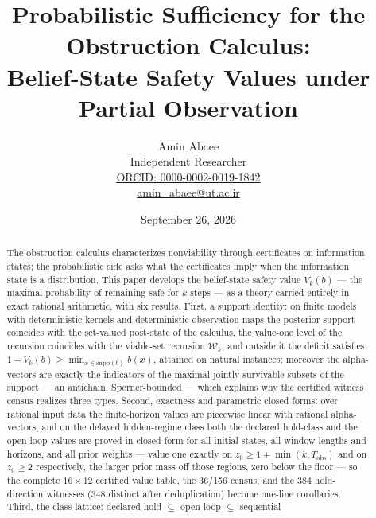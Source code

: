 \documentclass[10pt,twocolumn]{article}
\theoremstyle{plain}
\theoremstyle{definition}
\theoremstyle{remark}
\begin{document}
\title{Probabilistic Sufficiency for the Obstruction Calculus:\\
Belief-State Safety Values under Partial Observation}
\author{Amin Abaee\\[0.35em]
{\small Independent Researcher}\\[0.55em]
{\small\href{https://orcid.org/0000-0002-0019-1842}{ORCID: 0000-0002-0019-1842}}\\[0.3em]
{\small\href{mailto:amin\_abaee@ut.ac.ir}{amin\_abaee@ut.ac.ir}}}
\date{September 26, 2026}
\maketitle

\begin{abstract}
The obstruction calculus characterizes nonviability through certificates on
information states; the probabilistic side asks what the certificates imply
when the information state is a distribution. This paper develops the
belief-state safety value \(V_{k}(b)\) --- the maximal probability of
remaining safe for \(k\) steps --- as a theory carried entirely in exact
rational arithmetic, with six results. First, a support identity: on
finite models with deterministic kernels and deterministic observation
maps the posterior support coincides with the set-valued post-state of the
calculus, the value-one level of the recursion coincides with the
viable-set recursion \(\mathcal{W}_{k}\), and outside it the deficit
satisfies \(1 - V_{k}(b) \ge \min_{x \in \mathrm{supp}(b)} b(x)\), attained
on natural instances; moreover the alpha-vectors are exactly the
indicators of the maximal jointly survivable subsets of the support ---
an antichain, Sperner-bounded --- which explains why the certified witness
census realizes three types. Second, exactness and parametric closed
forms: over rational input data the finite-horizon values are piecewise
linear with rational alpha-vectors, and on the delayed hidden-regime
class both the declared hold-class and the open-loop values are proved in
closed form for all initial states, all window lengths and horizons, and
all prior weights --- value one exactly on
\(z_{0} \ge 1 + \min(k, T_{\mathrm{obs}})\) and on \(z_{0} \ge 2\)
respectively, the larger prior mass off those regions, zero below the
floor --- so the complete \(16 \times 12\) certified value table, the
36/156 census, and the 384 hold-direction witnesses (348 distinct after
deduplication) become one-line corollaries. Third, the class lattice:
declared hold \(\subseteq\) open-loop \(\subseteq\) sequential

\end{abstract}
\end{document}

